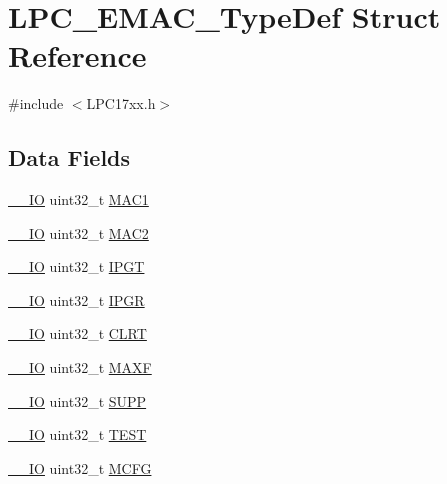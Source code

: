 \hypertarget{structLPC__EMAC__TypeDef}{}\section{L\+P\+C\+\_\+\+E\+M\+A\+C\+\_\+\+Type\+Def Struct Reference}
\label{structLPC__EMAC__TypeDef}


{\ttfamily \#include $<$L\+P\+C17xx.\+h$>$}

\subsection*{Data Fields}
\begin{DoxyCompactItemize}
\item 
\hyperlink{LPC17xx_8h_aec43007d9998a0a0e01faede4133d6be}{\+\_\+\+\_\+\+IO} uint32\+\_\+t \hyperlink{structLPC__EMAC__TypeDef_ab5156c31743f4789fd10310200d8d2bf}{M\+A\+C1}
\item 
\hyperlink{LPC17xx_8h_aec43007d9998a0a0e01faede4133d6be}{\+\_\+\+\_\+\+IO} uint32\+\_\+t \hyperlink{structLPC__EMAC__TypeDef_a7a8f40e4ac7644964cf3c9de45ad7e9e}{M\+A\+C2}
\item 
\hyperlink{LPC17xx_8h_aec43007d9998a0a0e01faede4133d6be}{\+\_\+\+\_\+\+IO} uint32\+\_\+t \hyperlink{structLPC__EMAC__TypeDef_a2e0b886d608716edd0d05e9056ad6aca}{I\+P\+GT}
\item 
\hyperlink{LPC17xx_8h_aec43007d9998a0a0e01faede4133d6be}{\+\_\+\+\_\+\+IO} uint32\+\_\+t \hyperlink{structLPC__EMAC__TypeDef_a98ca5496fcb495c925d4a6429c48923d}{I\+P\+GR}
\item 
\hyperlink{LPC17xx_8h_aec43007d9998a0a0e01faede4133d6be}{\+\_\+\+\_\+\+IO} uint32\+\_\+t \hyperlink{structLPC__EMAC__TypeDef_a3892dc5feb00ab5bb78954b83ae642c8}{C\+L\+RT}
\item 
\hyperlink{LPC17xx_8h_aec43007d9998a0a0e01faede4133d6be}{\+\_\+\+\_\+\+IO} uint32\+\_\+t \hyperlink{structLPC__EMAC__TypeDef_a4dbac18bf1bf0a94bea71396039f6d80}{M\+A\+XF}
\item 
\hyperlink{LPC17xx_8h_aec43007d9998a0a0e01faede4133d6be}{\+\_\+\+\_\+\+IO} uint32\+\_\+t \hyperlink{structLPC__EMAC__TypeDef_a36c57fffa4599db2b827a6a6487c4a8e}{S\+U\+PP}
\item 
\hyperlink{LPC17xx_8h_aec43007d9998a0a0e01faede4133d6be}{\+\_\+\+\_\+\+IO} uint32\+\_\+t \hyperlink{structLPC__EMAC__TypeDef_a2248f0f7143f009c0b54253379af0401}{T\+E\+ST}
\item 
\hyperlink{LPC17xx_8h_aec43007d9998a0a0e01faede4133d6be}{\+\_\+\+\_\+\+IO} uint32\+\_\+t \hyperlink{structLPC__EMAC__TypeDef_a1b04c1855f4e234e32e3585957d6fdd6}{M\+C\+FG}

\end{DoxyCompactItemize}
